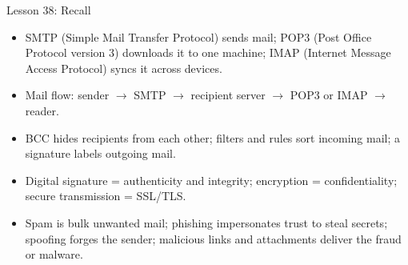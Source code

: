 \documentclass[aspectratio=169]{beamer}
\begin{document}
\begin{frame}{Lesson 38: Recall}
  \begin{itemize}
    \item SMTP (Simple Mail Transfer Protocol) sends mail; POP3 (Post
      Office Protocol version 3) downloads it to one machine; IMAP
      (Internet Message Access Protocol) syncs it across devices.
    \item Mail flow: sender $\rightarrow$ SMTP $\rightarrow$
      recipient server $\rightarrow$ POP3 or IMAP $\rightarrow$
      reader.
    \item BCC hides recipients from each other; filters and rules sort
      incoming mail; a signature labels outgoing mail.
    \item Digital signature = authenticity and integrity; encryption =
      confidentiality; secure transmission = SSL/TLS.
    \item Spam is bulk unwanted mail; phishing impersonates trust to
      steal secrets; spoofing forges the sender; malicious links and
      attachments deliver the fraud or malware.
  \end{itemize}
\end{frame}
\end{document}
